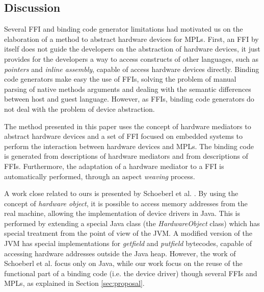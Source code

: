 \subsection{Discussion} \label{sota_disc}
Several FFI and binding code generator limitations had motivated us on the
elaboration of a method to abstract hardware devices for MPLs.
First, an FFI by itself does not guide the developers on the abstraction of
hardware devices, it just provides for the developers a way to access
constructs of other languages, such as \emph{pointers} and \emph{inline assembly},
capable of access hardware devices directly.
Binding code generators make easy the use of FFIs, solving the problem of manual
parsing of native methods arguments and dealing with the semantic differences
between host and guest language.
However, as FFIs, binding code generators do not deal with the problem of
device abstraction.

The method presented in this paper uses the concept of hardware mediators to
abstract hardware devices and a set of FFI focused on embedded systems to
perform the interaction between hardware devices and MPLs.
The binding code is generated from descriptions of hardware mediators and
from descriptions of FFIs.
Furthermore, the adaptation of a hardware mediator to
a FFI is automatically performed, through an aspect \emph{weaving} process.

A work close related to ours is presented by Schoeberl et al. \cite{Schoeberl:2011}.
By using the concept of \emph{hardware object}, it is possible to access memory
addresses from the real machine, allowing the implementation of device drivers
in Java.
This is performed by extending a special Java class (the \emph{HardwareObject} class)
which has special treatment from the point of view of the JVM.
A modified version of the JVM has special implementations for
\emph{getfield} and \emph{putfield} bytecodes, capable of accessing hardware
addresses outside the Java heap.
However, the work of Schoeberl et al. focus only on Java, while our work focus on
the reuse of the functional part of a binding code (i.e. the device driver) though
several FFIs and MPLs, as explained in Section \ref{sec:proposal}.

